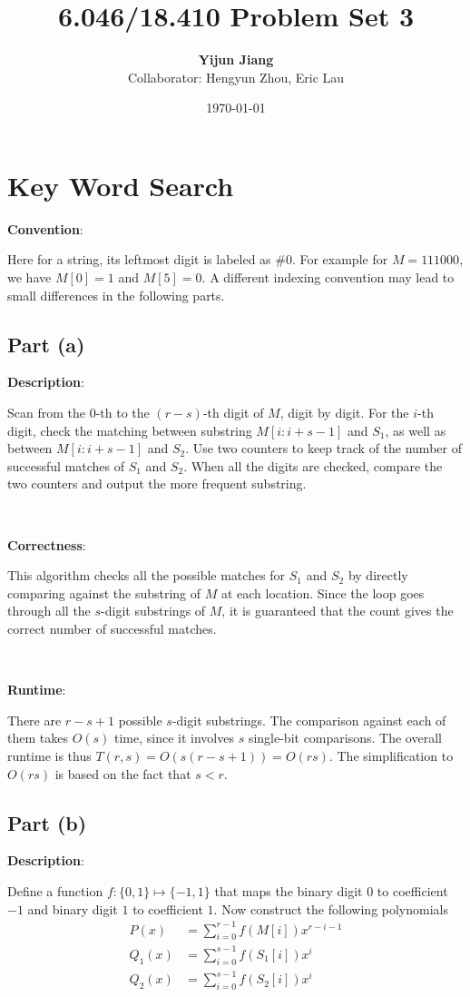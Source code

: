 \documentclass{article}
\title{6.046/18.410 Problem Set 3}
\author{\textbf{Yijun Jiang}\\Collaborator: Hengyun Zhou, Eric Lau}
\date{\today}
\begin{document}
\maketitle

\section{Key Word Search}
\noindent\textbf{Convention}:

Here for a string, its leftmost digit is labeled as \#0. For example for $M=111000$, we have $M[0]=1$ and $M[5]=0$. A different indexing convention may lead to small differences in the following parts.

\subsection{Part (a)}
\noindent\textbf{Description}:

Scan from the 0-th to the $(r-s)$-th digit of $M$, digit by digit. For the $i$-th digit, check the matching between substring $M[i:i+s-1]$ and $S_1$, as well as between $M[i:i+s-1]$ and $S_2$. Use two counters to keep track of the number of successful matches of $S_1$ and $S_2$. When all the digits are checked, compare the two counters and output the more frequent substring.

~

\noindent\textbf{Correctness}:

This algorithm checks all the possible matches for $S_1$ and $S_2$ by directly comparing against the substring of $M$ at each location. Since the loop goes through all the $s$-digit substrings of $M$, it is guaranteed that the count gives the correct number of successful matches.

~

\noindent\textbf{Runtime}:

There are $r-s+1$ possible $s$-digit substrings. The comparison against each of them takes $O(s)$ time, since it involves $s$ single-bit comparisons. The overall runtime is thus $T(r,s)=O(s(r-s+1))=O(rs)$. The simplification to $O(rs)$ is based on the fact that $s<r$.

\subsection{Part (b)}
\noindent\textbf{Description}:

Define a function $f:\{0,1\}\mapsto\{-1,1\}$ that maps the binary digit $0$ to coefficient $-1$ and binary digit $1$ to coefficient $1$. Now construct the following polynomials
\begin{align*}
P(x)&=\sum_{i=0}^{r-1}f(M[i])x^{r-i-1}\\
Q_1(x)&=\sum_{i=0}^{s-1}f(S_1[i])x^i\\
Q_2(x)&=\sum_{i=0}^{s-1}f(S_2[i])x^i
\end{align*}
\end{document}
